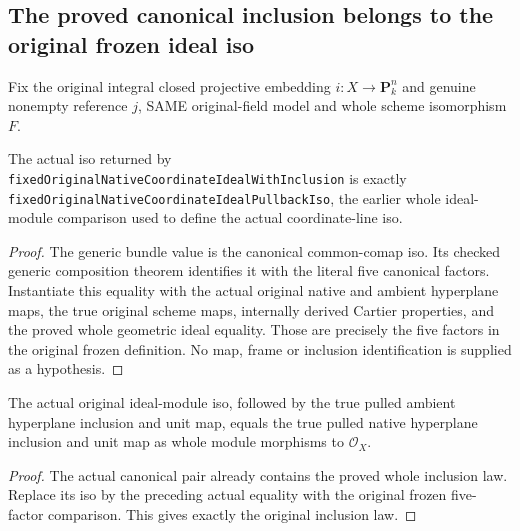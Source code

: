 \subsection{The proved canonical inclusion belongs to the original frozen ideal iso}
Fix the original integral closed projective embedding $i:X\to\mathbf P^n_k$
and genuine nonempty reference $j$, SAME original-field model and whole
scheme isomorphism $F$.
\begin{lemma}
\label{lem:seven-original-coordinate-comap-bundle-identification}
\leanok
{}
The actual iso returned by \texttt{fixedOriginalNativeCoordinateIdealWithInclusion}
is exactly \texttt{fixedOriginalNativeCoordinateIdealPullbackIso}, the earlier
whole ideal-module comparison used to define the actual coordinate-line iso.
\end{lemma}
\begin{proof}
The generic bundle value is the canonical common-comap iso. Its checked
generic composition theorem identifies it with the literal five canonical
factors. Instantiate this equality with the actual original native and
ambient hyperplane maps, the true original scheme maps, internally derived
Cartier properties, and the proved whole geometric ideal equality. Those
are precisely the five factors in the original frozen definition. No map,
frame or inclusion identification is supplied as a hypothesis.
\end{proof}
\begin{theorem}
\label{thm:seven-original-coordinate-pullback-ideal-inclusion}
\leanok
{}
The actual original ideal-module iso, followed by the true pulled ambient
hyperplane inclusion and unit map, equals the true pulled native hyperplane
inclusion and unit map as whole module morphisms to $\mathcal O_X$.
\end{theorem}
\begin{proof}
The actual canonical pair already contains the proved whole inclusion law.
Replace its iso by the preceding actual equality with the original frozen
five-factor comparison. This gives exactly the original inclusion law.
\end{proof}

